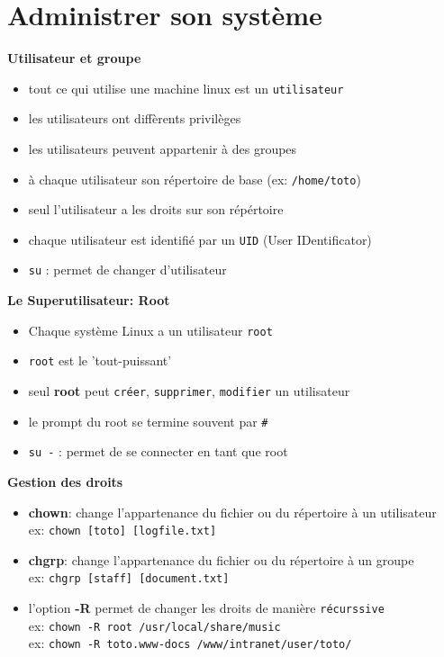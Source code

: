 \documentclass[french]{beamer}
\begin{document}
\section{Administrer son système}
\frame{\tableofcontents[current]}


\begin{frame}
\textbf{Utilisateur et groupe}
    \begin{itemize}
    \item tout ce qui utilise une machine linux est un \texttt{utilisateur}
    \item les utilisateurs ont diffèrents privilèges
    \item les utilisateurs peuvent appartenir à des groupes
    \item à chaque utilisateur son répertoire de base (ex: \texttt{/home/toto})
    \item seul l'utilisateur a les droits sur son répértoire
    \item chaque utilisateur est identifié par un \texttt{UID} (User IDentificator)
    \item \texttt{su} : permet de changer d'utilisateur
    \end{itemize}
\end{frame}

\begin{frame}
\textbf{Le Superutilisateur: Root}
    \begin{itemize}
    \item Chaque système Linux a un utilisateur \texttt{root}
    \item \texttt{root} est le 'tout-puissant'
    \item seul \textbf{root} peut \texttt{créer}, \texttt{supprimer},
    \texttt{modifier} un utilisateur
    \item le prompt du root se termine souvent par \texttt{\#}
    \item \texttt{su -} : permet de se connecter en tant que root
    \end{itemize}
\end{frame}

\begin{frame}
\textbf{Gestion des droits}
    \begin{itemize}
    \item \textbf{chown}: change l'appartenance du fichier ou du répertoire  à
    un utilisateur\\
    ex: \texttt{chown [toto] [logfile.txt]}
    \item \textbf{chgrp}: change l'appartenance du fichier ou du répertoire à
    un groupe \\
    ex: \texttt{chgrp [staff] [document.txt]}
    \item l'option \textbf{-R} permet de changer les droits de manière
    \texttt{récurssive} \\
    ex: \texttt{chown -R root /usr/local/share/music} \\
    ex: \texttt{chown -R toto.www-docs  /www/intranet/user/toto/}
    \end{itemize}
\end{frame}
\end{document}
